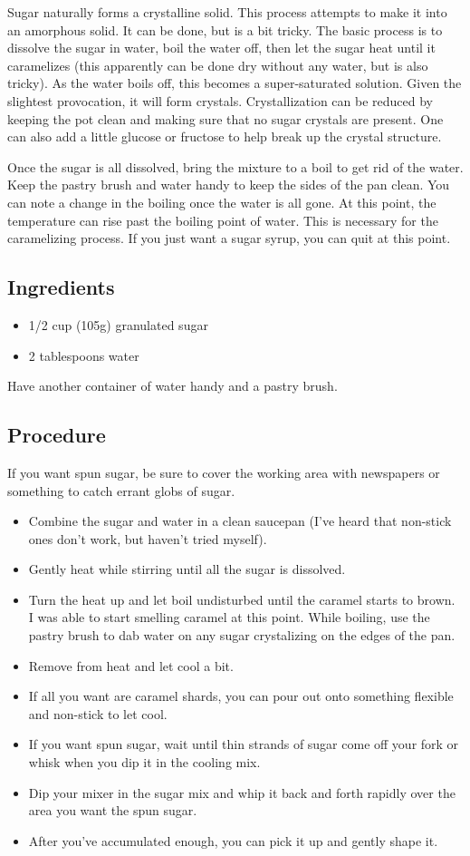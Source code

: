 \documentclass[10pt, openany]{book}
\begin{document}
Sugar naturally forms a crystalline solid.  This process attempts to make it into an amorphous solid.  It can be done, but is a bit tricky.  The basic process is to dissolve the sugar in water, boil the water off, then let the sugar heat until it caramelizes (this apparently can be done dry without any water, but is also tricky).  As the water boils off, this becomes a super-saturated solution.  Given the slightest provocation, it will form crystals.  Crystallization can be reduced by keeping the pot clean and making sure that no sugar crystals are present.  One can also add a little glucose or fructose to help break up the crystal structure.

Once the sugar is all dissolved, bring the mixture to a boil to get rid of the water.  Keep the pastry brush and water handy to keep the sides of the pan clean.  You can note a change in the boiling once the water is all gone.  At this point, the temperature can rise past the boiling point of water.  This is necessary for the caramelizing process.  If you just want a sugar syrup, you can quit at this point.

\subsection{Ingredients}
\begin{itemize}
  \item 1/2 cup (105g) granulated sugar
  \item 2 tablespoons water
\end{itemize}
Have another container of water handy and a pastry brush.
\subsection{Procedure}
If you want spun sugar, be sure to cover the working area with newspapers or something to catch errant globs of sugar.
\begin{itemize}
  \item Combine the sugar and water in a clean saucepan (I've heard that non-stick ones don't work, but haven't tried myself).
  \item Gently heat while stirring until all the sugar is dissolved.
  \item Turn the heat up and let boil undisturbed until the caramel starts to brown.  I was able to start smelling caramel at this point.  While boiling, use the pastry brush to dab water on any sugar crystalizing on the edges of the pan.
  \item Remove from heat and let cool a bit.
  \item If all you want are caramel shards, you can pour out onto something flexible and non-stick to let cool.
  \item If you want spun sugar, wait until thin strands of sugar come off your fork or whisk when you dip it in the cooling mix.
  \item Dip your mixer in the sugar mix and whip it back and forth rapidly over the area you want the spun sugar.
  \item After you've accumulated enough, you can pick it up and gently shape it.
\end{itemize}
\end{document}
